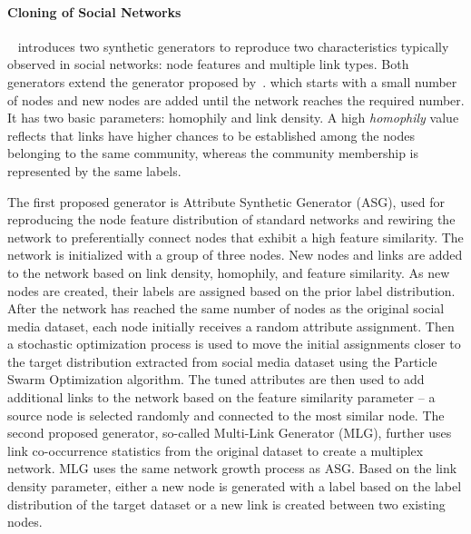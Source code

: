 \paragraph{Cloning of Social Networks} ~\cite{Sukthankar-SocialInfo2014}
introduces two synthetic generators to reproduce two characteristics typically
observed in social networks: node features and multiple link types. Both
generators extend  the generator proposed by~\cite{wang2011leveraging}.
which starts with a small number of
nodes and new nodes are added until the network reaches the required number. It
has two basic parameters: homophily and link density. A high \emph{homophily}
value reflects that links have higher chances to be established among the nodes belonging to the same community, 
whereas the community membership is represented by the same labels.

The first proposed generator is Attribute Synthetic Generator (ASG), used for
reproducing the node feature distribution of standard networks and rewiring the
network to preferentially connect nodes that exhibit a high feature similarity.
The network is initialized with a group of three nodes. New nodes and links
are added to the network based on link density, homophily, and feature
similarity. As new nodes are created, their labels are assigned based on the
prior label distribution. After the network has reached the same number of nodes
as the original social media dataset, each node initially receives a random
attribute assignment. Then a stochastic optimization process is used to move the
initial assignments closer to the target distribution extracted from social
media dataset using the Particle Swarm Optimization algorithm. The tuned
attributes are then used to add additional links to the network based on the
feature similarity parameter -- a source node is selected randomly and connected
to the most similar node. The second proposed generator, so-called Multi-Link Generator
(MLG), further  uses link co-occurrence statistics from the original dataset to
create a multiplex network. MLG uses the same network growth process as ASG.
Based on the link density parameter, either a new node is generated with a label
based on the label distribution of the target dataset or a new link is created
between two existing nodes.


